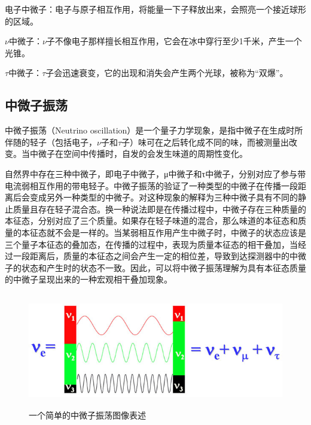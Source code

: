 \documentclass[10pt,a4paper]{article}
\begin{document}
电子中微子：电子与原子相互作用，将能量一下子释放出来，会照亮一个接近球形的区域。

$\nu$中微子：$\nu$子不像电子那样擅长相互作用，它会在冰中穿行至少1千米，产生一个光锥。

$\tau$中微子：$\tau$子会迅速衰变，它的出现和消失会产生两个光球，被称为“双爆”。

\newpage

\subsection{中微子振荡}\label{sub:sysover}


中微子振荡（Neutrino oscillation）是一个量子力学现象，是指中微子在生成时所伴随的轻子（包括电子，$\nu$子和$\tau$子）味可在之后转化成不同的味，而被测量出改变。当中微子在空间中传播时，自发的会发生味道的周期性变化。

自然界中存在三种中微子，即电子中微子，μ中微子和τ中微子，分别对应了参与带电流弱相互作用的带电轻子。中微子振荡的验证了一种类型的中微子在传播一段距离后会变成另外一种类型的中微子。对这种现象的解释为三种中微子具有不同的静止质量且存在轻子混合态。换一种说法即是在传播过程中，中微子存在三种质量的本征态，分别对应了三个质量。如果存在轻子味道的混合，那么味道的本征态和质量的本征态就不会是一样的。当某弱相互作用产生中微子时，中微子的状态应该是三个量子本征态的叠加态，在传播的过程中，表现为质量本征态的相干叠加，当经过一段距离后，质量的本征态之间会产生一定的相位差，导致到达探测器中的中微子的状态和产生时的状态不一致。因此，可以将中微子振荡理解为具有本征态质量的中微子呈现出来的一种宏观相干叠加现象。
\begin{figure}[ht]
 \centering
 \includegraphics[height=5cm]{images/中微子振荡示意图.jpg}
 \caption{一个简单的中微子振荡图像表述}
 \label{fig:singleblock}
\end{figure}
\end{document}
